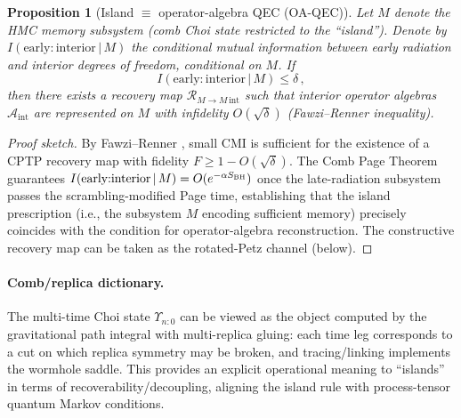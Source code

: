 \documentclass[a4paper,11pt]{article}
\newcommand{\ie}{i.e.\xspace}
\newcommand{\HMC}{\textsc{HMC}\xspace}
\theoremstyle{plain}
\newtheorem{proposition}{Proposition}
\theoremstyle{definition}
\theoremstyle{remark}
\begin{document}
\begin{proposition}[Island $\equiv$ operator-algebra QEC (OA-QEC)]
\label{prop:island-oa-qec}
Let $M$ denote the \HMC{} memory subsystem (comb Choi state restricted to the ``island''). Denote by $I(\text{early}{:}\text{interior}\,|\,M)$ the conditional mutual information between early radiation and interior degrees of freedom, conditional on $M$.
If 
\[
I(\text{early}{:}\text{interior}\,|\,M)\leq \delta\,,
\]
then there exists a recovery map $\mathcal{R}_{M\to M\,\text{int}}$ such that interior operator algebras $\mathcal{A}_{\text{int}}$ are represented on $M$ with infidelity $O(\sqrt{\delta})$ (Fawzi--Renner inequality).
\end{proposition}
\begin{proof}[Proof sketch]
By Fawzi--Renner \cite{FawziRenner:2015}, small CMI is sufficient for the existence of a CPTP recovery map with fidelity $F\geq 1-O(\sqrt{\delta})$. 
The Comb Page Theorem guarantees $I(\text{early}{:}\text{interior}\,|\,M)=O(e^{-\alpha S_{\rm BH}})$ once the late-radiation subsystem passes the scrambling-modified Page time, establishing that the island prescription (\ie, the subsystem $M$ encoding sufficient memory) precisely coincides with the condition for operator-algebra reconstruction.
The constructive recovery map can be taken as the rotated-Petz channel (below).
\end{proof}

\paragraph{Comb/replica dictionary.}
The multi-time Choi state $\Upsilon_{n{:}0}$ can be viewed as the object computed by the gravitational path integral with multi-replica gluing:
each time leg corresponds to a cut on which replica symmetry may be broken, and tracing/linking implements the wormhole saddle.
This provides an explicit operational meaning to ``islands'' in terms of recoverability/decoupling, aligning the island rule with process-tensor quantum Markov conditions.
\end{document}
